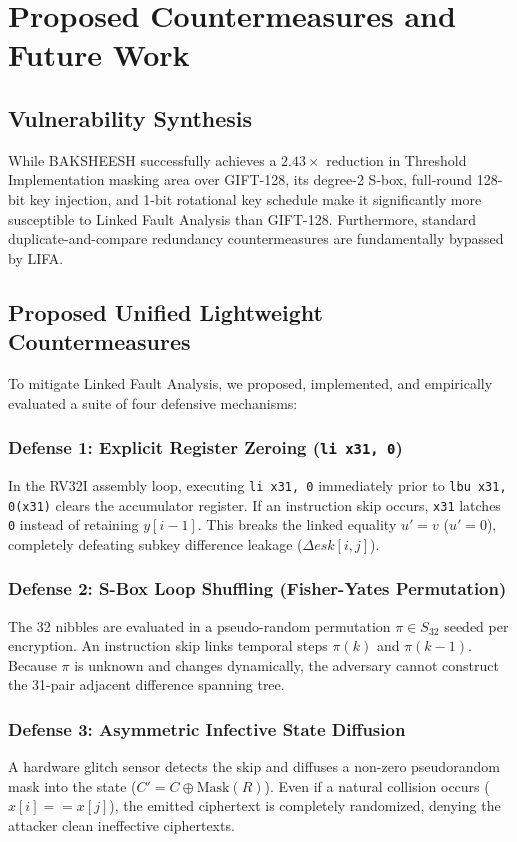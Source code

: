 \chapter{Proposed Countermeasures and Future Work}
\label{ch:countermeasures}

\section{Vulnerability Synthesis}
\label{sec:synth}
While BAKSHEESH successfully achieves a $2.43\times$ reduction in Threshold Implementation masking area over GIFT-128, its degree-2 S-box, full-round 128-bit key injection, and 1-bit rotational key schedule make it significantly more susceptible to Linked Fault Analysis than GIFT-128. Furthermore, standard duplicate-and-compare redundancy countermeasures are fundamentally bypassed by LIFA.

\section{Proposed Unified Lightweight Countermeasures}
\label{sec:proposed_countermeasures}
To mitigate Linked Fault Analysis, we proposed, implemented, and empirically evaluated a suite of four defensive mechanisms:

\subsection{Defense 1: Explicit Register Zeroing (\texttt{li x31, 0})}
In the RV32I assembly loop, executing \texttt{li x31, 0} immediately prior to \texttt{lbu x31, 0(x31)} clears the accumulator register. If an instruction skip occurs, \texttt{x31} latches \texttt{0} instead of retaining $y[i-1]$. This breaks the linked equality $u' = v$ ($u' = 0$), completely defeating subkey difference leakage ($\Delta esk[i, j]$).

\subsection{Defense 2: S-Box Loop Shuffling (Fisher-Yates Permutation)}
The 32 nibbles are evaluated in a pseudo-random permutation $\pi \in S_{32}$ seeded per encryption. An instruction skip links temporal steps $\pi(k)$ and $\pi(k-1)$. Because $\pi$ is unknown and changes dynamically, the adversary cannot construct the 31-pair adjacent difference spanning tree.

\subsection{Defense 3: Asymmetric Infective State Diffusion}
A hardware glitch sensor detects the skip and diffuses a non-zero pseudorandom mask into the state ($C' = C \oplus \text{Mask}(R)$). Even if a natural collision occurs ($x[i] == x[j]$), the emitted ciphertext is completely randomized, denying the attacker clean ineffective ciphertexts.

